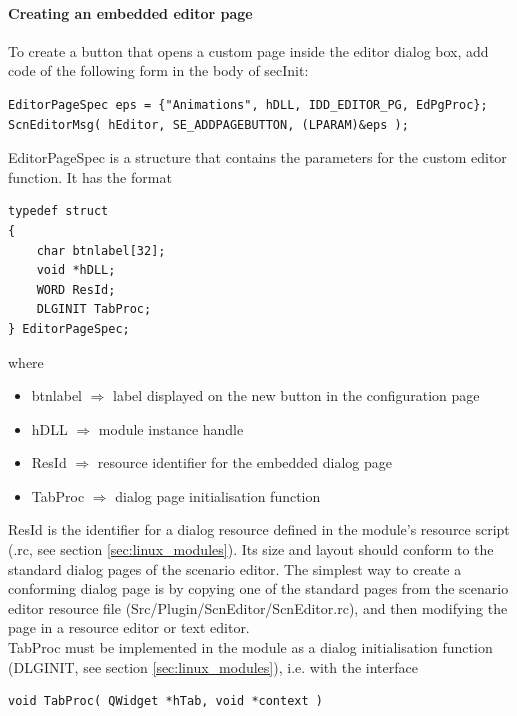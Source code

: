 \documentclass[Orbiter Developer Manual.tex]{subfiles}
\begin{document}
\paragraph{Creating an embedded editor page}
To create a button that opens a custom page inside the editor dialog box, add code of the following form in the body of secInit:

\begin{lstlisting}
EditorPageSpec eps = {"Animations", hDLL, IDD_EDITOR_PG, EdPgProc};
ScnEditorMsg( hEditor, SE_ADDPAGEBUTTON, (LPARAM)&eps );
\end{lstlisting}

\noindent
EditorPageSpec is a structure that contains the parameters for the custom editor function. It has the format

\begin{lstlisting}
typedef struct
{
	char btnlabel[32];
	void *hDLL;
	WORD ResId;
	DLGINIT TabProc;
} EditorPageSpec;
\end{lstlisting}

\noindent
where

\begin{itemize}
\item btnlabel $\Rightarrow$ label displayed on the new button in the configuration page
\item hDLL $\Rightarrow$ module instance handle
\item ResId $\Rightarrow$ resource identifier for the embedded dialog page
\item TabProc $\Rightarrow$ dialog page initialisation function
\end{itemize}

\noindent
ResId is the identifier for a dialog resource defined in the module's resource script (.rc, see section \ref{sec:linux_modules}). Its size and layout should conform to the standard dialog pages of the scenario editor. The simplest way to create a conforming dialog page is by copying one of the standard pages from the scenario editor resource file (Src/Plugin/ScnEditor/ScnEditor.rc), and then modifying the page in a resource editor or text editor.\\
TabProc must be implemented in the module as a dialog initialisation function (DLGINIT, see section \ref{sec:linux_modules}), i.e. with the interface

\begin{lstlisting}
void TabProc( QWidget *hTab, void *context )
\end{lstlisting}
\end{document}
